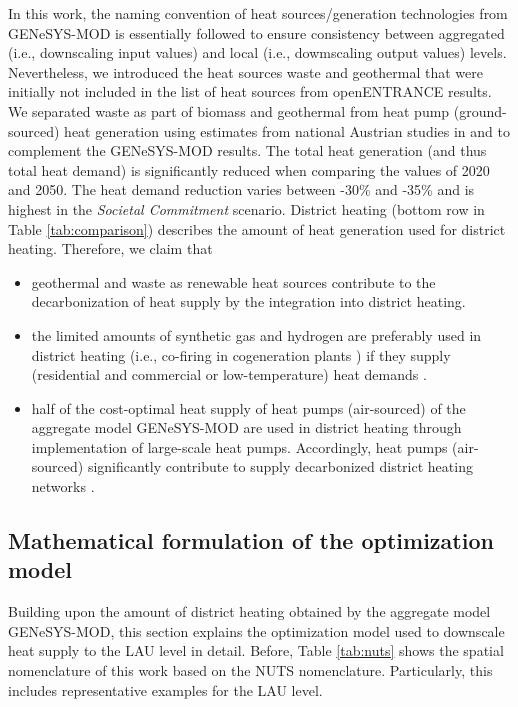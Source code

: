 In this work, the naming convention of heat sources/generation technologies from GENeSYS-MOD is essentially followed to ensure consistency between aggregated (i.e., downscaling input values) and local (i.e., dowmscaling output values) levels. Nevertheless, we introduced the heat sources waste and geothermal that were initially not included in the list of heat sources from openENTRANCE results. We separated waste as part of biomass and geothermal from heat pump (ground-sourced) heat generation using estimates from national Austrian studies in \cite{konighofer2014potenzial} and \cite{buchele2015bewertung} to complement the GENeSYS-MOD results.  The total heat generation (and thus total heat demand) is significantly reduced when comparing the values of 2020 and 2050. The heat demand reduction varies between -30\% and -35\% and is highest in the \textit{Societal Commitment} scenario. District heating (bottom row in Table \ref{tab:comparison}) describes the amount of heat generation used for district heating.  Therefore, we claim that

\begin{itemize}
	\item geothermal \cite{weinand2019developing} and waste \cite{fruergaard2010energy} as renewable heat sources contribute to the decarbonization of heat supply by the integration into district heating.
	\item the limited amounts of synthetic gas and hydrogen are preferably used in district heating (i.e., co-firing in cogeneration plants \cite{zwickl2022demystifying}) if they supply (residential and commercial or low-temperature) heat demands \cite{gerhardt2020hydrogen, jensen2020potential, dodds2015hydrogen}.
	\item half of the cost-optimal heat supply of heat pumps (air-sourced) of the aggregate model GENeSYS-MOD are used in district heating through implementation of large-scale heat pumps. Accordingly, heat pumps (air-sourced) significantly contribute to supply decarbonized district heating networks \cite{bach2016integration}. 
\end{itemize}

\subsection{Mathematical formulation of the optimization model}\label{sec:eq}
Building upon the amount of district heating obtained by the aggregate model GENeSYS-MOD, this section explains the optimization model used to downscale heat supply to the LAU level in detail. Before, Table \ref{tab:nuts} shows the spatial nomenclature of this work based on the NUTS nomenclature. Particularly, this includes representative examples for the LAU level. 

